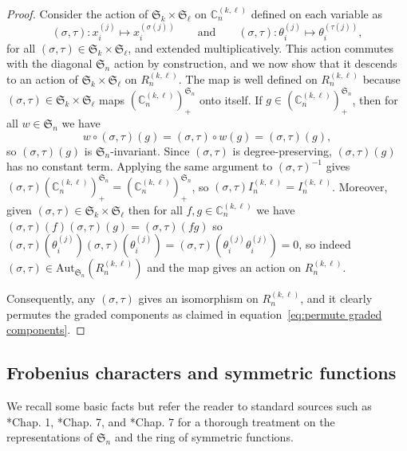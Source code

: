 \documentclass[11pt, reqno]{amsart}
\theoremstyle{definition}
\theoremstyle{remark}
\numberwithin{equation}{section}
\newcommand{\0}{\emptyset}
\newcommand{\C}{\mathbb{C}}
\renewcommand{\S}{\mathfrak{S}}
\begin{document}
\begin{proof}
    Consider the action of $\S_k \times \S_\ell$ on $\C_n^{(k,\ell)}$ 
    defined on each variable as 
    \[
         (\sigma, \tau): x_i^{(j)} \mapsto x_i^{(\sigma(j))} 
         \qquad \text{and} \qquad 
         (\sigma, \tau): \theta_i^{(j)} \mapsto \theta_i^{(\tau(j))}, 
    \]
    for all $(\sigma, \tau) \in \S_k \times \S_\ell$, 
    and extended multiplicatively. 
    This action commutes with the diagonal $\S_n$ action by construction, 
    and we now show that it descends to an action of 
    $\S_k \times \S_\ell$ on $R_n^{(k,\ell)}$. 
    The map is well defined on $R_n^{(k,\ell)}$ because $(\sigma, \tau) \in \S_k \times \S_\ell$ maps $\left(\C_n^{(k,\ell)}\right)^{\S_n}_+$ onto itself.
    If $g \in \left(\C_n^{(k,\ell)}\right)^{\S_n}_+$, then
    for all $w\in \S_n$ we have 
    \[
        w \circ (\sigma,\tau)(g) = 
        (\sigma,\tau) \circ w(g) = 
        (\sigma,\tau)  (g), 
    \]
    so $(\sigma,\tau)(g)$ is $\S_n$-invariant. Since $(\sigma,\tau)$ is degree-preserving, $(\sigma,\tau)(g)$ has no constant term.
    Applying the same argument to $(\sigma,\tau)^{-1}$ gives $(\sigma,\tau)\left(\C_n^{(k,\ell)}\right)^{\S_n}_+ = \left(\C_n^{(k,\ell)}\right)^{\S_n}_+$,
    so $(\sigma,\tau) I_n^{(k,\ell)} = I_n^{(k,\ell)}$. 
    Moreover, given $(\sigma,\tau) \in \S_k \times \S_\ell$ then 
    for all $f, g \in \C_n^{(k,\ell)}$ we have 
    $(\sigma,\tau)(f) (\sigma,\tau)(g) = (\sigma,\tau)(fg)$ so 
    $(\sigma,\tau)(\theta_i^{(j)}) (\sigma,\tau)(\theta_i^{(j)}) = 
    (\sigma,\tau)(\theta_i^{(j)}\theta_i^{(j)}) = 0$, so indeed 
    $(\sigma, \tau) \in \mathrm{Aut}_{\S_n}\left(R_n^{(k,\ell)}\right)$ 
    and the map gives an action on $R_n^{(k,\ell)}$. 

    Consequently, any $(\sigma,\tau)$ gives an isomorphism on $R_n^{(k,\ell)}$, 
    and it clearly permutes the graded components as claimed 
    in equation~\eqref{eq:permute graded components}. 
\end{proof}

\subsection{Frobenius characters and symmetric functions}

We recall some basic facts but refer the reader to standard sources such as \cite{Macdonald}*{Chap. 1}, \cite{StanleyEC2}*{Chap. 7}, and \cite{fulton-youngtableaux}*{Chap. 7} for a thorough treatment on the representations of $\S_n$ and the ring of symmetric functions. 
\end{document}

